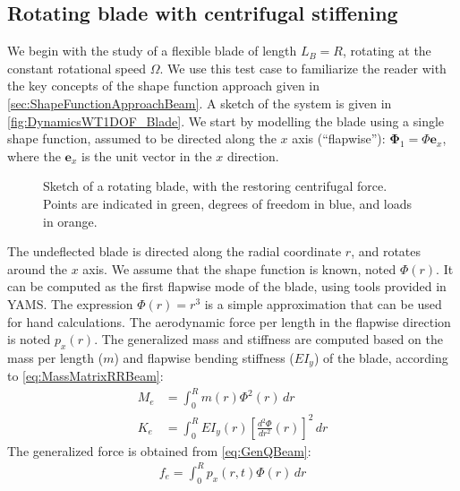 \documentclass[wes, manuscript]{copernicus}
\renewcommand{\v}[1]{\boldsymbol{#1}}
\begin{document}
\subsection{Rotating blade with centrifugal stiffening}
\label{sec:RotatingBlade}
We begin with the study of a flexible blade of length $L_B=R$, rotating at the constant rotational speed $\Omega$.
We use this test case to familiarize the reader with the key concepts of the shape function approach given in \autoref{sec:ShapeFunctionApproachBeam}. 
A sketch of the system is given in \autoref{fig:DynamicsWT1DOF_Blade}.
We start by modelling the blade using a single shape function, assumed to be directed along the $x$ axis (``flapwise''): $\v{\Phi}_1=\Phi \v{e}_x$, where the $\v{e}_x$ is the unit vector in the $x$ direction.
\begin{figure}[!htb]
 \centering%
 \def\svgwidth{0.5\columnwidth}%
 \caption{Sketch of a rotating blade, with the restoring centrifugal force. Points are indicated in green, degrees of freedom in blue, and loads in orange.}\label{fig:DynamicsWT1DOF_Blade}%
 \end{figure}%
The undeflected blade is directed along the radial coordinate $r$, and rotates around the $ x$ axis.
We assume that the shape function is known, noted $\Phi(r)$. 
It can be computed as the first flapwise mode of the blade, using tools provided in YAMS.
The expression $\Phi(r)=r^3$ is a simple approximation that can be used for hand calculations. 
The aerodynamic force per length in the flapwise direction is noted $p_x(r)$.
The generalized mass and stiffness are computed based on the mass per length ($m$) and flapwise bending stiffness ($EI_y$) of the blade, according to \autoref{eq:MassMatrixRRBeam}:
\begin{align}
  M_{e}&=\int_0^{R} m(r) \Phi^2(r)\, dr
  \label{eq:MeBlade}
      \\
  K_{e}&=\int_0^{R} EI_y(r) \left[\frac{d^2\Phi}{dr^2}(r)\right]^2\, dr
  \label{eq:KeBlade}
\end{align}
The generalized force is obtained from \autoref{eq:GenQBeam}:
\begin{align}
  f_{e}=\int_0^{R} p_x(r,t)\Phi(r)\, dr 
\end{align}
\end{document}
